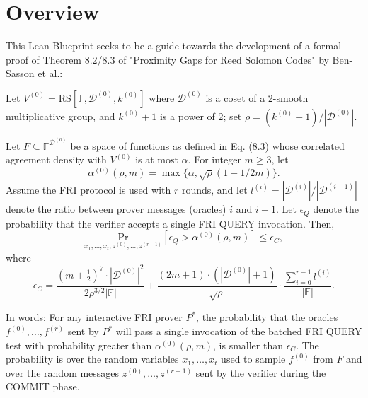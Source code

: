 %

\chapter*{Overview}

This Lean Blueprint seeks to be a guide towards the development of a formal proof of Theorem 8.2/8.3 of "Proximity Gaps for Reed Solomon Codes" by Ben-Sasson et al.:

\begin{lemma}[8.2] \label{Batched FRI error bound}
  Let $V^{(0)} = \mathrm{RS}[\mathbb{F},\mathcal{D}^{(0)},k^{(0)}]$ where $\mathcal{D}^{(0)}$ is a coset of a
  2-smooth multiplicative group, and $k^{(0)} + 1$ is a power of 2; set $\rho = (k^{(0)} + 1)/|\mathcal{D}^{(0)}|$.

  Let $F \subseteq \mathbb{F}^{\mathcal{D}^{(0)}}$ be a space of functions as defined in Eq. (8.3) whose correlated agreement density
  with $V^{(0)}$ is at most $\alpha$. For integer $m \geq 3$, let
  \[\alpha^{(0)}(\rho,m) = \max\{\alpha, \sqrt{\rho}(1+1/2m)\}.\]
  Assume the FRI protocol is used with $r$ rounds, and let $l^{(i)} = |\mathcal{D}^{(i)}|/|\mathcal{D}^{(i+1)}|$ denote the ratio between
  prover messages (oracles) $i$ and $i+1$. Let $\epsilon_Q$ denote the probability that the verifier accepts a single
  FRI QUERY invocation. Then,
  \[
  \underset{x_1,\ldots,x_t,z^{(0)},\ldots,z^{(r-1)}}{\mathrm{Pr}}[\epsilon_Q > \alpha^{(0)}(\rho,m)] \leq \epsilon_C,
  \]
  where
  \[
  \epsilon_C = \frac{(m+\frac{1}{2})^7 \cdot |\mathcal{D}^{(0)}|^2}{2\rho^{3/2}|\mathbb{F}|} + \frac{(2m+1) \cdot (|\mathcal{D}^{(0)}|+1)}{\sqrt{\rho}} \cdot \frac{\sum_{i=0}^{r-1}l^{(i)}}{|\mathbb{F}|}.
  \]

  In words: For any interactive FRI prover $P^*$, the probability that the oracles $f^{(0)},\ldots,f^{(r)}$ sent
  by $P^*$ will pass a single invocation of the batched FRI QUERY test with probability greater than
  $\alpha^{(0)}(\rho,m)$, is smaller than $\epsilon_C$. The probability is over the random variables $x_1,\ldots,x_t$ used to sample
  $f^{(0)}$ from $F$ and over the random messages $z^{(0)},\ldots,z^{(r-1)}$ sent by the verifier during the COMMIT
  phase.
\end{lemma}

